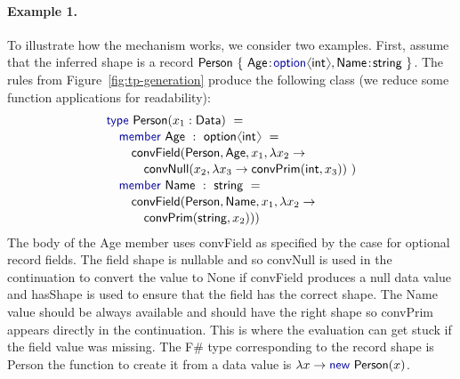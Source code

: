 \documentclass[10pt,preprint,blind,clearpagebib]{sigplanconf}
\newcommand{\langl}{\begin{picture}(4.5,7)
\put(1.1,2.5){\rotatebox{60}{\line(1,0){5.5}}}
\put(1.1,2.5){\rotatebox{300}{\line(1,0){5.5}}}
\end{picture}}
\newcommand{\rangl}{\begin{picture}(4.5,7)
\put(.9,2.5){\rotatebox{120}{\line(1,0){5.5}}}
\put(.9,2.5){\rotatebox{240}{\line(1,0){5.5}}}
\end{picture}}
\newcommand{\kvd}[1]{\textnormal{\textcolor{kvdclr}{\sffamily #1}}}
\newcommand{\ident}[1]{\textnormal{\sffamily #1}}
\begin{document}

\paragraph{Example 1.}
To illustrate how the mechanism works, we consider two examples. First, assume 
that the inferred shape is a record  
$\ident{Person}~\{~\ident{Age}\!:\!\kvd{option}\langl\ident{int}\rangl, \ident{Name}\!:\!\ident{string}~ \}$. 
The rules from Figure~\ref{fig:tp-generation} produce the following class (we reduce some 
function applications for readability):
%
\vspace{-0.1em}
\begin{equation*}
\begin{array}{l}
 \kvd{type}~\ident{Person}(x_1:\ident{Data})~= \\[0.1em]
 \quad \kvd{member}~\ident{Age}~:~\ident{option}\langl\ident{int}\rangl~= \\[0.1em]
 \qquad \ident{convField}(\ident{Person}, \ident{Age}, x_1, \lambda x_2 \rightarrow \\[0.1em]
 \qquad \quad \ident{convNull}(x_2, \lambda x_3\rightarrow\ident{convPrim}(\ident{int}, x_3))~) \\[0.1em]
 \quad \kvd{member}~\ident{Name}~:~\ident{string}~= \\[0.1em]
 \qquad \ident{convField}(\ident{Person},\ident{Name}, x_1, \lambda x_2 \rightarrow \\[0.1em]
 \qquad \quad \ident{convPrim}(\ident{string}, x_2)))
\end{array}
\end{equation*}
%
The body of the \ident{Age} member uses \ident{convField} as specified by the case for optional
record fields. The field shape is nullable and so \ident{convNull} is used in the continuation to 
convert the value to \ident{None} if \ident{convField} produces a \kvd{null} data value and 
\ident{hasShape} is used to ensure that the field has the correct shape. The \ident{Name} value should
be always available and should have the right shape so \ident{convPrim} appears directly in the 
continuation. This is where the evaluation can get stuck if the field value was missing. The F\# 
type corresponding to the record shape is \ident{Person} the function to create it from a data value 
is $\lambda x \rightarrow \kvd{new}~\ident{Person}(x)$.
\end{document}
